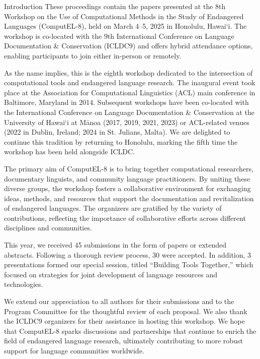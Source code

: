 Introduction
These proceedings contain the papers presented at the 8th Workshop on the Use of Computational Methods in the Study of Endangered Languages (ComputEL-8), held on March 4–5, 2025 in Honolulu, Hawai‘i. The workshop is co-located with the 9th International Conference on Language Documentation & Conservation (ICLDC9) and offers hybrid attendance options, enabling participants to join either in-person or remotely.

As the name implies, this is the eighth workshop dedicated to the intersection of computational tools and endangered language research. The inaugural event took place at the Association for Computational Linguistics (ACL) main conference in Baltimore, Maryland in 2014. Subsequent workshops have been co-located with the International Conference on Language Documentation & Conservation at the University of Hawai‘i at Mānoa (2017, 2019, 2021, 2023) or ACL-related venues (2022 in Dublin, Ireland; 2024 in St. Julians, Malta). We are delighted to continue this tradition by returning to Honolulu, marking the fifth time the workshop has been held alongside ICLDC.

The primary aim of ComputEL-8 is to bring together computational researchers, documentary linguists, and community language practitioners. By uniting these diverse groups, the workshop fosters a collaborative environment for exchanging ideas, methods, and resources that support the documentation and revitalization of endangered languages. The organizers are gratified by the variety of contributions, reflecting the importance of collaborative efforts across different disciplines and communities.

This year, we received 45 submissions in the form of papers or extended abstracts. Following a thorough review process, 30 were accepted. In addition, 3 presentations formed our special session, titled “Building Tools Together,” which focused on strategies for joint development of language resources and technologies.

We extend our appreciation to all authors for their submissions and to the Program Committee for the thoughtful review of each proposal. We also thank the ICLDC9 organizers for their assistance in hosting this workshop. We hope that ComputEL-8 sparks discussions and partnerships that continue to enrich the field of endangered language research, ultimately contributing to more robust support for language communities worldwide.